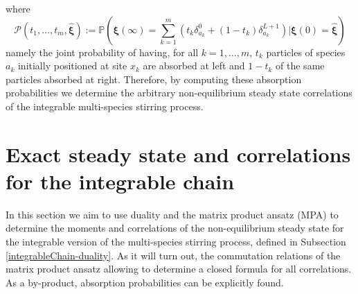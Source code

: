 \documentclass[10pt]{article}
\numberwithin{equation}{section}
\numberwithin{equation}{subsection}
\begin{document}
where
\begin{equation}\label{absProbabilitiesIntegrable}
	\mathcal{P}(t_{1},\ldots,t_{m},\hat{\bm{\xi}}):=\mathbb{P}\left(\bm{\xi}(\infty)=\sum_{k=1}^{m}\left(t_{k}\delta^{0}_{a_k}+(1-t_{k})\delta^{L+1}_{a_k}\right)\lvert \bm{\xi}(0)=\hat{\bm{\xi}}\right)
\end{equation}
 namely the joint probability of having, for all $k=1,\ldots,m$, $t_{k}$ particles of species $a_{k}$ initially positioned at site $x_{k}$ are absorbed at left and $1-t_{k}$ of the same particles absorbed at right. Therefore, by computing these absorption probabilities we determine the arbitrary non-equilibrium steady state correlations of the integrable multi-species stirring process. 






\section{Exact steady state and correlations for the integrable chain}\label{sectionIntegrabiliy}
In this section we aim to use duality and the matrix product ansatz (MPA) to determine the moments and correlations of the non-equilibrium steady state for the integrable version of the multi-species stirring process, defined in Subsection \ref{integrableChain-duality}. As it will turn out, the commutation relations of the matrix product ansatz allowing to determine a closed formula for all correlations. As a by-product, absorption probabilities can be explicitly found.%
\end{document}
